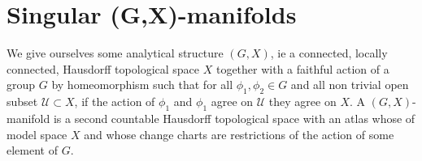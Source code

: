 \documentclass[a4paper,12pt]{article}
\newtheorem{lem}{Lemma}[section]          %
\def\D{\mathcal{D}}
\def\U{\mathcal U}
\def\N{\mathbb N}
\def\d{\mathrm{d}}
\def\D{\mathcal{D}}
\def\SS{\mathbb{S}}
\def\d{\mathrm{d}}
\def\N{\mathbb{N}}
\def\D{\mathcal{D}}
\def\U{\mathcal{U}}
\begin{document}
% 
% 
% 
% 
% 
% 
%  
% 
% 
% 
%  


\section{Singular (G,X)-manifolds}  \label{sec:GXsing}
We give ourselves some analytical structure $(G,X)$, ie a connected, locally connected, Hausdorff topological space $X$ together with a faithful action of a group $G$ by homeomorphism such that for all $\phi_1,\phi_2\in G$ and all non trivial open subset $\U\subset X$, if the action of $\phi_1$ and $\phi_1$ agree on $\U$ they agree on $X$. A $(G,X)$-manifold is a second countable Hausdorff topological space with an atlas whose of model space $X$ and whose change charts are restrictions of the action of some element of $G$. 
\end{document}
